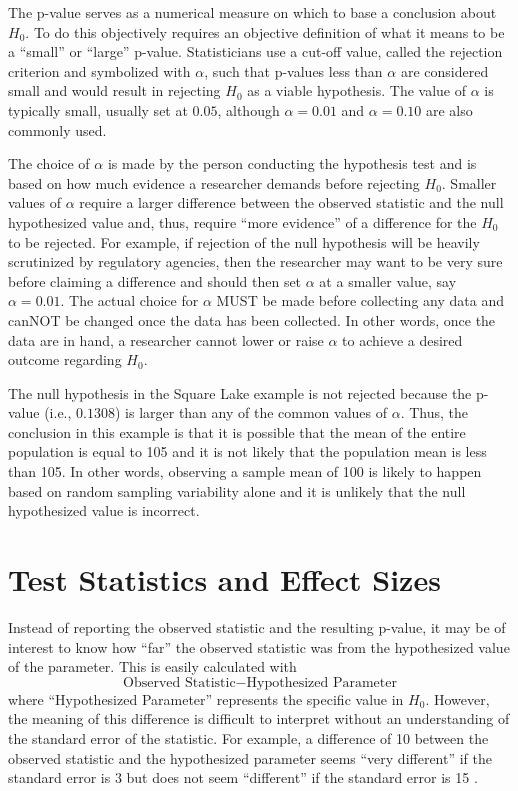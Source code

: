 \documentclass[10pt,openany]{book}\usepackage[]{graphicx}\usepackage[]{color}
\begin{document}
The p-value serves as a numerical measure on which to base a conclusion about $H_{0}$. To do this objectively requires an objective definition of what it means to be a ``small'' or ``large'' p-value. Statisticians use a cut-off value, called the rejection criterion and symbolized with $\alpha$, such that p-values less than $\alpha$ are considered small and would result in rejecting $H_{0}$ as a viable hypothesis. The value of $\alpha$ is typically small, usually set at $0.05$, although $\alpha=0.01$ and $\alpha=0.10$ are also commonly used.

The choice of $\alpha$ is made by the person conducting the hypothesis test and is based on how much evidence a researcher demands before rejecting $H_{0}$. Smaller values of $\alpha$ require a larger difference between the observed statistic and the null hypothesized value and, thus, require ``more evidence'' of a difference for the $H_{0}$ to be rejected. For example, if rejection of the null hypothesis will be heavily scrutinized by regulatory agencies, then the researcher may want to be very sure before claiming a difference and should then set $\alpha$ at a smaller value, say $\alpha=0.01$. The actual choice for $\alpha$ MUST be made before collecting any data and canNOT be changed once the data has been collected. In other words, once the data are in hand, a researcher cannot lower or raise $\alpha$ to achieve a desired outcome regarding $H_{0}$.


The null hypothesis in the Square Lake example is not rejected because the p-value (i.e., $0.1308$) is larger than any of the common values of $\alpha$. Thus, the conclusion in this example is that it is possible that the mean of the entire population is equal to 105 and it is not likely that the population mean is less than 105. In other words, observing a sample mean of 100 is likely to happen based on random sampling variability alone and it is unlikely that the null hypothesized value is incorrect.


\newpage
\section{Test Statistics and Effect Sizes}
Instead of reporting the observed statistic and the resulting p-value, it may be of interest to know how ``far'' the observed statistic was from the hypothesized value of the parameter. This is easily calculated with
\[ \text{Observed Statistic}-\text{Hypothesized Parameter} \]
where ``Hypothesized Parameter'' represents the specific value in $H_{0}$. However, the meaning of this difference is difficult to interpret without an understanding of the standard error of the statistic. For example, a difference of 10 between the observed statistic and the hypothesized parameter seems ``very different'' if the standard error is 3 but does not seem ``different'' if the standard error is 15 .
\end{document}
